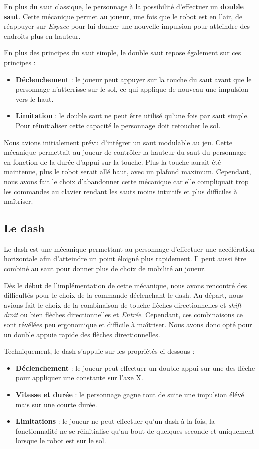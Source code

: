 \documentclass[10pt]{report}
\begin{document}
En plus du saut classique, le personnage à la possibilité d'effectuer un \textbf{double saut}. Cette mécanique permet au joueur, une fois que le robot est en l'air, de réappuyer sur \emph{Espace} pour lui donner une nouvelle impulsion pour atteindre des endroits plus en hauteur. 

En plus des principes du saut simple, le double saut repose également sur ces principes :

\begin{itemize}
  \item \textbf{Déclenchement} : le joueur peut appuyer sur la touche du saut avant que le personnage n'atterrisse sur le sol, ce qui applique de nouveau une impulsion vers le haut.
  \item \textbf{Limitation} : le double saut ne peut être utilisé qu'une fois par saut simple. Pour réinitialiser cette capacité le personnage doit retoucher le sol.
\end{itemize}


Nous avions initialement prévu d'intégrer un saut modulable au jeu. Cette mécanique permettait au joueur de contrôler la hauteur du saut du personnage en fonction de la durée d'appui sur la touche. Plus la touche aurait été maintenue, plus le robot serait allé haut, avec un plafond maximum.
Cependant, nous avons fait le choix d'abandonner cette mécanique car elle compliquait trop les commandes au clavier rendant les sauts moins intuitifs et plus difficiles à maîtriser. 

\subsection{Le dash}
Le dash est une mécanique permettant au personnage d'effectuer une accélération horizontale afin d'atteindre un point éloigné plus rapidement. Il peut aussi être combiné au saut pour donner plus de choix de mobilité au joueur.

Dès le début de l'implémentation de cette mécanique, nous avons rencontré des difficultés pour le choix de la commande déclenchant le dash. Au départ, nous avions fait le choix de la combinaison de touche flèches directionnelles et \emph{shift droit} ou bien flèches directionnelles et \emph{Entrée}. Cependant, ces combinaisons ce sont révélées peu ergonomique et difficile à maîtriser. Nous avons donc opté pour un double appuie rapide des flèches directionnelles.

Techniquement, le dash s'appuie sur les propriétés ci-dessous :
\begin{itemize}
  \item \textbf{Déclenchement} : le joueur peut effectuer un double appui sur une des flèche pour appliquer une constante sur l'axe X.
  \item \textbf{Vitesse et durée} : le personnage gagne tout de suite une impulsion élévé mais sur une courte durée.
  \item \textbf{Limitations} : le joueur ne peut effectuer qu'un dash à la fois, la fonctionnalité ne se réinitialise qu'au bout de quelques seconde et uniquement lorsque le robot est sur le sol. 
\end{itemize}
\end{document}
